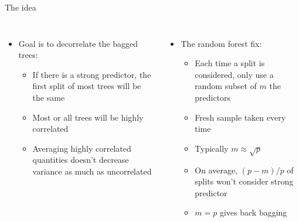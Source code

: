 \documentclass[aspectratio=169,usenames,dvipsnames]{beamer}
\begin{document}
\begin{frame}[t]{The idea }

\begin{columns}
\centering
\begin{itemize}
	\item Goal is to decorrelate the bagged trees:
	\begin{itemize}
		\item If there is a strong predictor, the first split of most trees will be the same
		\item Most or all trees will be highly correlated
		\item Averaging highly correlated quantities doesn't decrease variance as much as uncorrelated
	\end{itemize}
\end{itemize}
\centering
\begin{itemize}
	\item The random forest fix:
	\begin{itemize}
		\item Each time a split is considered, only use a random subset of $m$ the predictors
		\item Fresh sample taken every time
		\item Typically $m \approx \sqrt p$
		\item On average, $(p-m)/p$ of splits won't consider strong predictor
		\item $m = p$ gives back bagging
	\end{itemize}
\end{itemize}
\end{columns}

\end{frame}
\end{document}
